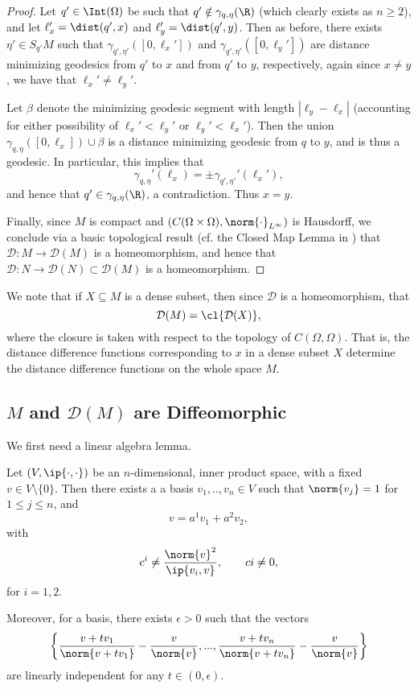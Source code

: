 \begin{proof}
Let $q'\in\Int(\Omega)$ be such that $q'\notin\gamma_{q,\eta}(\R)$ (which clearly exists as $n\geq 2$), and let $\ell_x'=\dist(q',x)$ and $\ell_y'=\dist(q',y)$.  Then as before, there exists $\eta'\in S_{q'}M$ such that $\gamma_{q',\eta'}([0,\ell_x'])$ and $\gamma_{q',\eta'}([0,\ell_y'])$ are distance minimizing geodesics from $q'$ to $x$ and from $q'$ to $y$, respectively, again since $x\neq y$, we have that $\ell_x'\neq\ell_y'$.

Let $\beta$ denote the minimizing geodesic segment with length $|\ell_y-\ell_x|$ (accounting for either possibility of $\ell_x'<\ell_y'$ or $\ell_y'<\ell_x'$).  Then the union $\gamma_{q,\eta}([0,\ell_x])\cup\beta$ is a distance minimizing geodesic from $q$ to $y$, and is thus a geodesic.  In particular, this implies that
$$\gamma_{q,\eta}'(\ell_x)=\pm\gamma_{q',\eta'}'(\ell_x'),$$
and hence that $q'\in\gamma_{q,\eta}(\R)$, a contradiction.  Thus $x=y$.

Finally, since $M$ is compact and $(C(\Omega\times\Omega),\norm{\cdot}_{L^\infty})$ is Hausdorff, we conclude via a basic topological result (cf. the Closed Map Lemma in \cite{lee2010introduction}) that $\mathcal{D}:M\to\mathcal{D}(M)$ is a homeomorphism, and hence that $\mathcal{D}:N\to\mathcal{D}(N)\subset\mathcal{D}(M)$ is a homeomorphism.


\end{proof}

We note that if $X\subseteq M$ is a dense subset, then since $\mathcal{D}$ is a homeomorphism, that
$$\mathcal{D}(M)=\cl{\mathcal{D}(X)},$$
where the closure is taken with respect to the topology of $C(\Omega,\Omega)$.  That is, the distance difference functions corresponding to $x$ in a dense subset $X$ determine the distance difference functions on the whole space $M$.



\subsection{$M$ and $\mathcal{D}(M)$ are Diffeomorphic}

We first need a linear algebra lemma.

\begin{lem}\label{thm:linAlgLemma}
    Let $(V,\ip{\cdot,\cdot})$ be an $n$-dimensional, inner product space, with a fixed $v\in V\setminus\{0\}$.  Then there exists a a basis $v_1,..,v_n\in V$ such that $\norm{v_j}=1$ for $1\leq j\leq n$, and
    $$v=a^1v_1+a^2v_2,$$
    with
    $$c^i\neq\frac{\norm{v}^2}{\ip{v_i,v}},\qquad ci\neq0,$$
    for $i=1,2$.
    
    Moreover, for a basis, there exists $\epsilon>0$ such that the vectors
    $$\left\{\frac{v+tv_1}{\norm{v+tv_1}}-\frac{v}{\norm{v}},...,\frac{v+tv_n}{\norm{v+tv_n}}-\frac{v}{\norm{v}}\right\}$$
    are linearly independent for any $t\in(0,\epsilon)$.
\end{lem}

